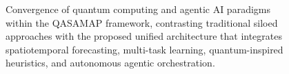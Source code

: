 \begin{figure}[htbp]
    \caption{Convergence of quantum computing and agentic AI paradigms within the QASAMAP framework, contrasting traditional siloed approaches with the proposed unified architecture that integrates spatiotemporal forecasting, multi-task learning, quantum-inspired heuristics, and autonomous agentic orchestration.}
    \label{fig:quantum_agentic_convergence}
\end{figure}
